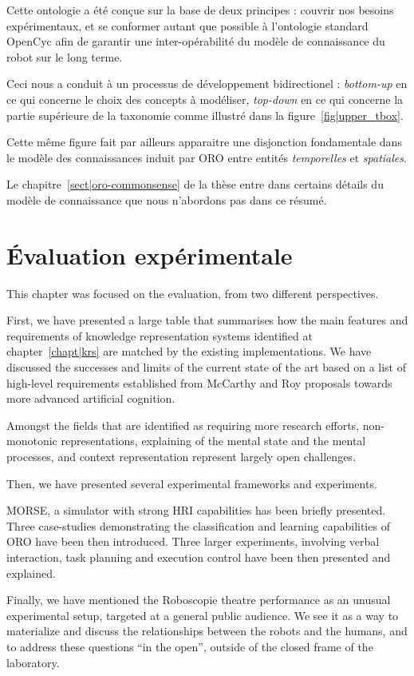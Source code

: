 Cette ontologie a été conçue sur la base de deux principes : couvrir nos
besoins expérimentaux, et se conformer autant que possible à l'ontologie
standard {\sc OpenCyc} afin de garantir une inter-opérabilité du modèle de
connaissance du robot sur le long terme.

Ceci nous a conduit à un processus de développement bidirectionel :
\textit{bottom-up} en ce qui concerne le choix des concepts à modéliser,
\textit{top-down} en ce qui concerne la partie supérieure de la taxonomie comme
illustré dans la figure~\ref{fig|upper_tbox}.

Cette même figure fait par ailleurs apparaitre une disjonction fondamentale
dans le modèle des connaissances induit par ORO entre entités
\emph{temporelles} et \emph{spatiales}.

Le chapitre~\ref{sect|oro-commonsense} de la thèse entre dans certains détails
du modèle de connaissance que nous n'abordons pas dans ce résumé.

\section{Évaluation expérimentale}


This chapter was focused on the evaluation, from two different perspectives.

First, we have presented a large table that summarises how the main features
and requirements of knowledge representation systems identified at
chapter~\ref{chapt|krs} are matched by the existing implementations. We have
discussed the successes and limits of the current state of the art based on a
list of high-level requirements established from McCarthy and Roy proposals
towards more advanced artificial cognition.

Amongst the fields that are identified as requiring more research efforts,
non-monotonic representations, explaining of the mental state and the mental
processes, and context representation represent largely open challenges.

Then, we have presented several experimental frameworks and experiments.

MORSE, a simulator with strong HRI capabilities has been briefly presented.
Three case-studies demonstrating the classification and learning capabilities
of ORO have been then introduced. Three larger experiments, involving verbal
interaction, task planning and execution control have been then presented and
explained.

Finally, we have mentioned the Roboscopie theatre performance as an unusual
experimental setup, targeted at a general public audience. We see it as a way
to materialize and discuss the relationships between the robots and the humans,
and to address these questions ``in the open'', outside of the closed frame of
the laboratory.





